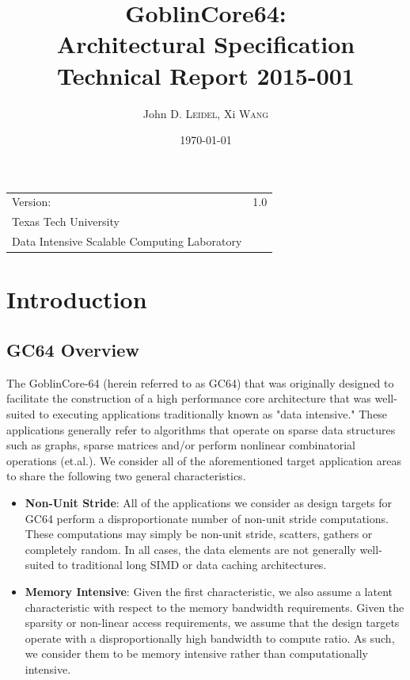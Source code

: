 \documentclass{article}
\title{GoblinCore64: \\ Architectural Specification \\ Technical Report 2015-001} %
\author{John D. \textsc{Leidel}, Xi \textsc{Wang}} %
\date{\today} %
\begin{document}
\maketitle %

\begin{center}
\begin{tabular}{l r}
Version: & 1.0 \\ %
Texas Tech University \\ %
Data Intensive Scalable Computing Laboratory \\ %

\end{tabular}
\end{center}

\newpage

\tableofcontents

\newpage

\section{Introduction}

\subsection{GC64 Overview}

The GoblinCore-64 (herein referred to as GC64) that was originally designed to 
facilitate the construction of a high performance core architecture that was
well-suited to executing applications traditionally known as "data intensive."  
These applications generally refer to algorithms that operate on sparse
data structures such as graphs, sparse matrices and/or perform nonlinear 
combinatorial operations (et.al.).  We consider all of the aforementioned target
application areas to share the following two general characteristics.  

\begin{itemize}
\item \textbf{Non-Unit Stride}: All of the applications we consider as design targets
for GC64 perform a disproportionate number of non-unit stride computations.  These 
  computations may simply be non-unit stride, scatters, gathers or completely random. 
  In all cases, the data elements are not generally well-suited to traditional 
  long SIMD or data caching architectures.
\item  \textbf{Memory Intensive}: Given the first characteristic, we also assume
  a latent characteristic with respect to the memory bandwidth requirements.  
  Given the sparsity or non-linear access requirements, we assume that the design 
  targets operate with a disproportionally high bandwidth to compute ratio.  As
  such, we consider them to be memory intensive rather than computationally
  intensive.  
\end{itemize} 
\end{document}
